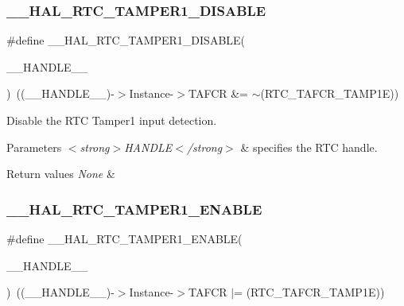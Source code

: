 \subsubsection{\texorpdfstring{\+\_\+\+\_\+\+H\+A\+L\+\_\+\+R\+T\+C\+\_\+\+T\+A\+M\+P\+E\+R1\+\_\+\+D\+I\+S\+A\+B\+LE}{\_\_HAL\_RTC\_TAMPER1\_DISABLE}}
{\footnotesize\ttfamily \#define \+\_\+\+\_\+\+H\+A\+L\+\_\+\+R\+T\+C\+\_\+\+T\+A\+M\+P\+E\+R1\+\_\+\+D\+I\+S\+A\+B\+LE(\begin{DoxyParamCaption}\item[{}]{\+\_\+\+\_\+\+H\+A\+N\+D\+L\+E\+\_\+\+\_\+ }\end{DoxyParamCaption})~((\+\_\+\+\_\+\+H\+A\+N\+D\+L\+E\+\_\+\+\_\+)-\/$>$Instance-\/$>$T\+A\+F\+CR \&= $\sim$(R\+T\+C\+\_\+\+T\+A\+F\+C\+R\+\_\+\+T\+A\+M\+P1E))}



Disable the R\+TC Tamper1 input detection. 


\begin{DoxyParams}{Parameters}
{\em $<$strong$>$\+H\+A\+N\+D\+L\+E$<$/strong$>$} & specifies the R\+TC handle. \\
\hline
\end{DoxyParams}

\begin{DoxyRetVals}{Return values}
{\em None} & \\
\hline
\end{DoxyRetVals}
\mbox{\label{group___r_t_c_ex___tamper_ga20e258063c402a28ebf29d11c1bdad66}} 
\subsubsection{\texorpdfstring{\+\_\+\+\_\+\+H\+A\+L\+\_\+\+R\+T\+C\+\_\+\+T\+A\+M\+P\+E\+R1\+\_\+\+E\+N\+A\+B\+LE}{\_\_HAL\_RTC\_TAMPER1\_ENABLE}}
{\footnotesize\ttfamily \#define \+\_\+\+\_\+\+H\+A\+L\+\_\+\+R\+T\+C\+\_\+\+T\+A\+M\+P\+E\+R1\+\_\+\+E\+N\+A\+B\+LE(\begin{DoxyParamCaption}\item[{}]{\+\_\+\+\_\+\+H\+A\+N\+D\+L\+E\+\_\+\+\_\+ }\end{DoxyParamCaption})~((\+\_\+\+\_\+\+H\+A\+N\+D\+L\+E\+\_\+\+\_\+)-\/$>$Instance-\/$>$T\+A\+F\+CR $\vert$= (R\+T\+C\+\_\+\+T\+A\+F\+C\+R\+\_\+\+T\+A\+M\+P1E))}



